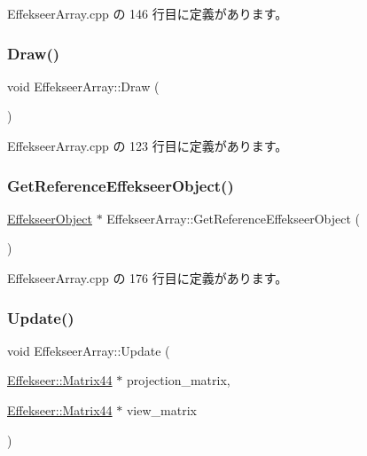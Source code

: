  Effekseer\+Array.\+cpp の 146 行目に定義があります。

\mbox{\label{class_effekseer_array_af915edc4a955bfc7927721a71016524d}} 
\subsubsection{\texorpdfstring{Draw()}{Draw()}}
{\footnotesize\ttfamily void Effekseer\+Array\+::\+Draw (\begin{DoxyParamCaption}{ }\end{DoxyParamCaption})}



 Effekseer\+Array.\+cpp の 123 行目に定義があります。

\mbox{\label{class_effekseer_array_a0bbf7d610ef2219e3699d3f26182af03}} 
\subsubsection{\texorpdfstring{Get\+Reference\+Effekseer\+Object()}{GetReferenceEffekseerObject()}}
{\footnotesize\ttfamily \mbox{\hyperlink{class_effekseer_object}{Effekseer\+Object}} $\ast$ Effekseer\+Array\+::\+Get\+Reference\+Effekseer\+Object (\begin{DoxyParamCaption}{ }\end{DoxyParamCaption})}



 Effekseer\+Array.\+cpp の 176 行目に定義があります。

\mbox{\label{class_effekseer_array_a41fcca7eb106c1c83851eca1284800f4}} 
\subsubsection{\texorpdfstring{Update()}{Update()}}
{\footnotesize\ttfamily void Effekseer\+Array\+::\+Update (\begin{DoxyParamCaption}\item[{\mbox{\hyperlink{struct_effekseer_1_1_matrix44}{Effekseer\+::\+Matrix44}} $\ast$}]{projection\+\_\+matrix,  }\item[{\mbox{\hyperlink{struct_effekseer_1_1_matrix44}{Effekseer\+::\+Matrix44}} $\ast$}]{view\+\_\+matrix }\end{DoxyParamCaption})}




